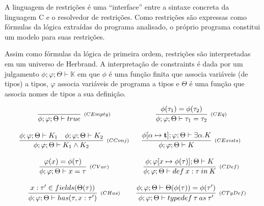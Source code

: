 \documentclass[a4paper,8pt]{article}
\begin{document}
     A linguagem de restrições é uma ``interface'' entre a sintaxe
     concreta da linguagem C e o resolvedor de restrições. Como
     restrições são expressas como fórmulas da lógica extraídas do 
     programa analisado, o próprio programa constitui um modelo 
     para suas restrições.

     Assim como fórmulas da lógica de primeira ordem, restrições são
     interpretadas em um universo de Herbrand. A interpretação de
     constraints é dada por um julgamento 
     $\phi ; \varphi ; \Theta \vdash \mathbb{K}$ em que $\phi$ é uma
     função finita que associa variáveis (de tipos) a tipos, $\varphi$
     associa variáveis de programa a tipos e $\Theta$ é uma função
     que associa nomes de tipos a sua definição.

     \[
          \begin{array}{cc}
      \infer[_{(CEmpty)}]{\phi ; \varphi ; \Theta \vdash true}{} & 
      \infer[_{(CEq)}]{\phi ; \varphi ; \Theta \vdash \tau_1 =
                                                                   \tau_2}{\phi(\tau_1)
                                                                   =
                                                                   \phi(\tau_2)}\\
        \\ 
       \infer[_{(CConj)}]{\phi ; \varphi ; \Theta \vdash K_1 \land K_2}
                            {\phi ; \varphi ; \Theta \vdash K_1 & 
                             \phi ; \varphi ; \Theta \vdash K_2 } &
        \infer[_{(CExists)}]{\phi ; \varphi ; \Theta \vdash K}
                                {\phi [\alpha \mapsto \textbf{t}] ; \varphi ; \Theta \vdash
                                                                    \exists
                                                                    \alpha
                                                                    . K
                                                                    }
            \\                                 
\\

\infer[_{(CVar)}]{\phi ; \varphi ; \Theta \vdash x = \tau}
                     {\varphi(x) = \phi(\tau) } &
\infer[_{(CDef)}]{\phi ; \varphi ; \Theta \vdash def\:x : \tau\:in\:
                                                  K}
                      {\phi ; \varphi [x \mapsto \phi(\tau) ]; \Theta
                                                  \vdash K} \\
\\
\infer[_{(CHas)}]{\phi ; \varphi ; \Theta \vdash has(\tau, x : \tau')}
                      {x : \tau'  \in fields(\Theta(\tau))} &
\infer[_{(CTyDef)}]{\phi ; \varphi ; \Theta \vdash typedef\: \tau\: as\:
                                                              \tau'}
                        {\phi ; \varphi ; \Theta \vdash \Theta(\phi(\tau)) =
                                                              \phi(\tau')}                                      
                                               
            
          \end{array}
     \]
\end{document}
